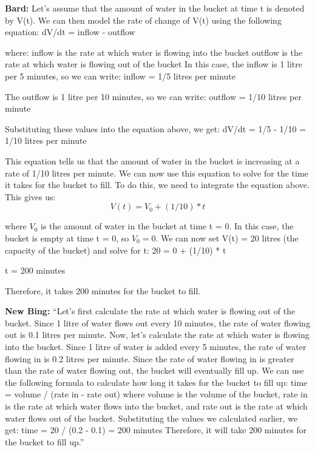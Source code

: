 \documentclass[11pt]{article} %
\begin{document}
\begin{mdframed}[
        backgroundcolor=white,  %
        linecolor=black,        %
        leftmargin=5pt,         %
        rightmargin=5pt,        %
        linewidth=2pt           %
    ]
    \textbf{Bard: } Let's assume that the amount of water in the bucket at time t is denoted by V(t). We can then model the rate of change of V(t) using the following equation:
    dV/dt = inflow - outflow

    where:
    inflow is the rate at which water is flowing into the bucket
    outflow is the rate at which water is flowing out of the bucket
    In this case, the inflow is 1 litre per 5 minutes, so we can write:
    inflow = 1/5 litres per minute

    The outflow is 1 litre per 10 minutes, so we can write:
    outflow = 1/10 litres per minute

    Substituting these values into the equation above, we get:
    dV/dt = 1/5 - 1/10 = 1/10 litres per minute

    This equation tells us that the amount of water in the bucket is increasing at a rate of 1/10 litres per minute. We can now use this equation to solve for the time it takes for the bucket to fill.
    To do this, we need to integrate the equation above. This gives us:
    $$
        V(t) = V_0 + (1/10) * t
    $$


    where $V_0$ is the amount of water in the bucket at time t = 0. In this case, the bucket is empty at time t = 0, so $V_0 = 0$.
    We can now set V(t) = 20 litres (the capacity of the bucket) and solve for t:
    20 = 0 + (1/10) * t

    t = 200 minutes

    Therefore, it takes 200 minutes for the bucket to fill.

\end{mdframed}

\begin{mdframed}[
        backgroundcolor=white,  %
        linecolor=black,        %
        leftmargin=5pt,         %
        rightmargin=5pt,        %
        linewidth=2pt           %
    ]
    \textbf{New Bing: }“Let's first calculate the rate at which water is flowing out of the bucket. Since 1 litre of water flows out every 10 minutes, the rate of water flowing out is 0.1 litres per minute.
    Now, let's calculate the rate at which water is flowing into the bucket. Since 1 litre of water is added every 5 minutes, the rate of water flowing in is 0.2 litres per minute.
    Since the rate of water flowing in is greater than the rate of water flowing out, the bucket will eventually fill up. We can use the following formula to calculate how long it takes for the bucket to fill up:
    time = volume / (rate in - rate out)
    where volume is the volume of the bucket, rate in is the rate at which water flows into the bucket, and rate out is the rate at which water flows out of the bucket.
    Substituting the values we calculated earlier, we get:
    time = 20 / (0.2 - 0.1) = 200 minutes
    Therefore, it will take 200 minutes for the bucket to fill up.”
\end{mdframed}
\end{document}
